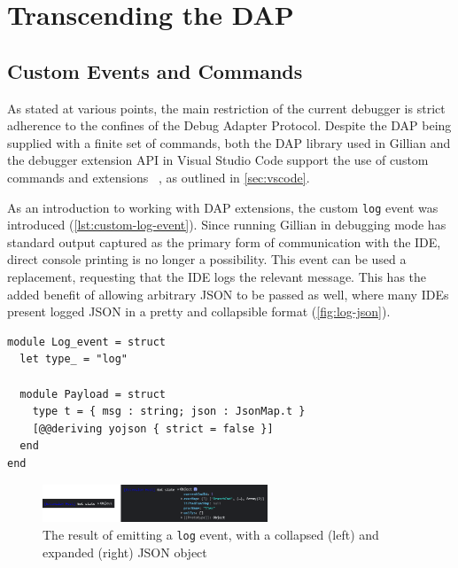 
\section{Transcending the DAP}\label{sec:debug-interface}

\subsection{Custom Events and Commands}

As stated at various points, the main restriction of the current debugger is
strict adherence to the confines of the Debug Adapter Protocol. Despite the DAP
being supplied with a finite set of commands, both the DAP library used in
Gillian and the debugger extension API in Visual Studio Code support the use of
custom commands and extensions%
~\cite{ocaml-dap-custom, vscode-dap-custom-event, vscode-dap-custom-request}, as
outlined in \autoref{sec:vscode}.

As an introduction to working with DAP extensions, the custom \texttt{log} event
was introduced (\autoref{lst:custom-log-event}). Since running Gillian in
debugging mode has standard output captured as the primary form of communication
with the IDE, direct console printing is no longer a possibility. This event
can be used a replacement, requesting that the IDE logs the relevant message.
This has the added benefit of allowing arbitrary JSON to be passed as well,
where many IDEs present logged JSON in a pretty and collapsible format
(\autoref{fig:log-json}).

\begin{lstlisting}[caption={
  The custom \texttt{log} event, in \texttt{Debugger\_log.ml}
  \label{lst:custom-log-event}}, style=code, numbers=none]
module Log_event = struct
  let type_ = "log"

  module Payload = struct
    type t = { msg : string; json : JsonMap.t }
    [@@deriving yojson { strict = false }]
  end
end
\end{lstlisting}

\begin{figure}
  \center{}
  \includegraphics[width=0.6\textwidth]{img/log-json.png}
  \caption{
    The result of emitting a \texttt{log} event, with a collapsed (left) and
    expanded (right) JSON object}%
  \label{fig:log-json}
\end{figure}

